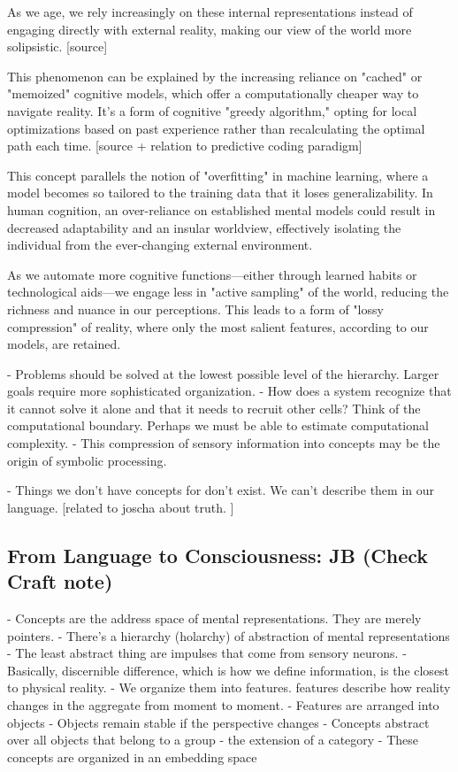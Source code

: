 As we age, we rely increasingly on these internal representations instead of engaging directly with external reality, making our view of the world more solipsistic. [source]

This phenomenon can be explained by the increasing reliance on "cached" or "memoized" cognitive models, which offer a computationally cheaper way to navigate reality. It's a form of cognitive "greedy algorithm," opting for local optimizations based on past experience rather than recalculating the optimal path each time. [source + relation to predictive coding paradigm]

This concept parallels the notion of "overfitting" in machine learning, where a model becomes so tailored to the training data that it loses generalizability. In human cognition, an over-reliance on established mental models could result in decreased adaptability and an insular worldview, effectively isolating the individual from the ever-changing external environment.

As we automate more cognitive functions—either through learned habits or technological aids—we engage less in "active sampling" of the world, reducing the richness and nuance in our perceptions. This leads to a form of "lossy compression" of reality, where only the most salient features, according to our models, are retained.


- Problems should be solved at the lowest possible level of the hierarchy. Larger goals require more sophisticated organization. 
- How does a system recognize that it cannot solve it alone and that it needs to recruit other cells? Think of the computational boundary. Perhaps we must be able to estimate computational complexity. 
- This compression of sensory information into concepts may be the origin of symbolic processing. 

- Things we don't have concepts for don't exist. We can't describe them in our language. [related to joscha about truth. ] 




\subsection{From Language to Consciousness: JB (Check Craft note)}
- Concepts are the address space of mental representations. They are merely pointers. 
- There’s a hierarchy (holarchy) of abstraction of mental representations
- The least abstract thing are impulses that come from sensory neurons. 
- Basically, discernible difference, which is how we define information, is the closest to physical reality.
- We organize them into features. features describe how reality changes in the aggregate from moment to moment.
- Features are arranged into objects
- Objects remain stable if the perspective changes
- Concepts abstract over all objects that belong to a group - the extension of a category
- These concepts are organized in an embedding space

